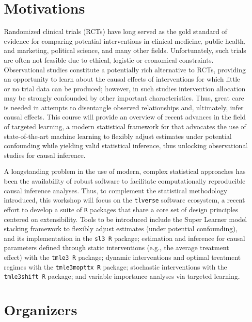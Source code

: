 \documentclass[a4paper,11pt]{texMemo}
\begin{document}
\section{Motivations}

Randomized clinical trials (RCTs) have long served as the gold standard of
evidence for comparing potential interventions in clinical medicine, public
health, and marketing, political science, and many other fields. Unfortunately,
such trials are often not feasible due to ethical, logistic or economical
constraints. Observational studies constitute a potentially rich alternative to
RCTs, providing an opportunity to learn about the causal effects of
interventions for which little or no trial data can be produced; however, in
such studies intervention allocation may be strongly confounded by other
important characteristics. Thus, great care is needed in attempts to disentangle
observed relationships and, ultimately, infer causal effects. This course will
provide an overview of recent advances in the field of targeted learning, a
modern statistical framework for that advocates the use of state-of-the-art
machine learning to flexibly adjust estimates under potential confounding while
yielding valid statistical inference, thus unlocking observational studies for
causal inference.

A longstanding problem in the use of modern, complex statistical approaches
has been the availability of robust software to facilitate computationally
reproducible causal inference analyses. Thus, to complement the statistical
methodology introduced, this workshop will focus on the \texttt{tlverse}
software ecosystem, a recent effort to develop a  suite of \texttt{R} packages
that share a core set of design principles centered on extensibility. Tools to
be introduced include the Super Learner model stacking framework to flexibly
adjust estimates (under potential confounding), and its implementation in the
\texttt{sl3 R} package; estimation and inference for causal parameters defined
through static interventions (e.g., the average treatment effect) with the
\texttt{tmle3 R} package; dynamic interventions and optimal treatment regimes
with the \texttt{tmle3mopttx R} package; stochastic interventions with the
\texttt{tmle3shift R} package; and variable importance analyses via targeted
learning.

\section{Organizers}
\end{document}
